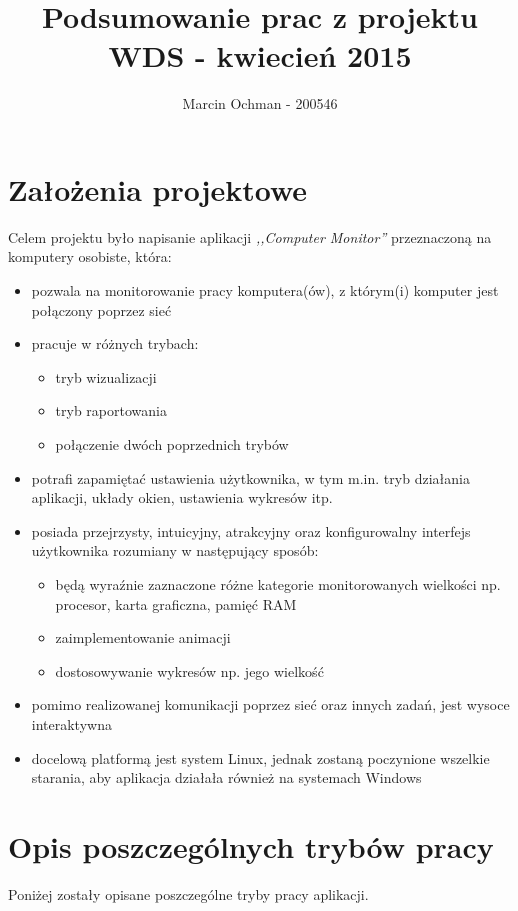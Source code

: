 \documentclass[a4paper]{article}
\title{\textbf{Podsumowanie prac z projektu WDS - kwiecień 2015}}
\author{Marcin Ochman - 200546}
\date{}
\begin{document}


\newpage

\tableofcontents
\listoffigures
\listoftables

\newpage

	\section{Założenia projektowe}
		Celem projektu było napisanie aplikacji \textit{,,Computer Monitor''} przeznaczoną na komputery osobiste, która:
	\begin{itemize}
		\item pozwala na monitorowanie pracy komputera(ów), z którym(i) komputer jest połączony poprzez sieć
		\item pracuje w różnych trybach:
		\begin{itemize}
			\item tryb wizualizacji
			\item tryb raportowania
			\item połączenie dwóch poprzednich trybów
		\end{itemize}
		\item potrafi zapamiętać ustawienia użytkownika, w tym m.in. tryb działania aplikacji, układy okien, ustawienia wykresów itp.
		\item posiada przejrzysty, intuicyjny, atrakcyjny oraz konfigurowalny interfejs użytkownika rozumiany w następujący sposób:
		\begin{itemize}
			\item będą wyraźnie zaznaczone różne kategorie monitorowanych wielkości np. procesor, karta graficzna, pamięć \uppercase{ram}
			\item zaimplementowanie animacji
			\item dostosowywanie wykresów np. jego wielkość
			 
		\end{itemize}
		\item pomimo realizowanej komunikacji poprzez sieć oraz innych zadań, jest wysoce 
		interaktywna
		\item docelową platformą jest system Linux, jednak zostaną poczynione wszelkie starania, aby aplikacja działała również na systemach Windows
	\end{itemize}
	
	\section{Opis poszczególnych trybów pracy}
	Poniżej zostały opisane poszczególne tryby pracy aplikacji.
	
\end{document}
